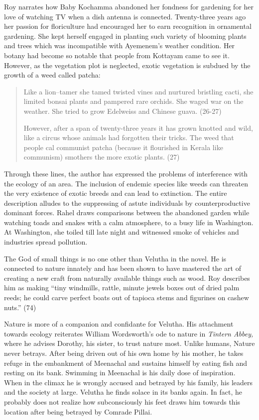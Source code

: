 Roy narrates how Baby Kochamma abandoned her fondness for gardening for her love of watching TV when a dish antenna is connected. Twenty-three years ago her passion for floriculture had encouraged her to earn recognition in ornamental gardening. She kept herself engaged in planting such variety of blooming plants and trees which was incompatible with Ayemenem’s weather condition. Her botany had become so notable that people from Kottayam came to see it. However, as the vegetation plot is neglected, exotic vegetation is subdued by the growth of a weed called patcha:

\begin{quote}
  Like a lion–tamer she tamed twisted vines and nurtured bristling cacti, she limited bonsai plants and pampered rare orchids. She waged war on the weather. She tried to grow Edelweiss and Chinese guava. (26-27)

  However, after a span of twenty-three years it has grown knotted and wild, like a circus whose animals had forgotten their tricks. The weed that people cal communist patcha (because it flourished in Kerala like communism) smothers the more exotic plants. (27)
\end{quote}

Through these lines, the author has expressed the problems of interference with the ecology of an area. The inclusion of endemic species like weeds can threaten the very existence of exotic breeds and can lead to extinction. The entire description alludes to the suppressing of astute individuals by counterproductive dominant forces. Rahel draws comparisons between the abandoned garden while watching toads and snakes with a calm atmosphere, to a busy life in Washington. At Washington, she toiled till late night and witnessed smoke of vehicles and industries spread pollution.

The God of small things is no one other than Velutha in the novel. He is connected to nature innately and has been shown to have mastered the art of creating a new craft from naturally available things such as wood. Roy describes him as making “tiny windmills, rattle, minute jewels boxes out of dried palm reeds; he could carve perfect boats out of tapioca stems and figurines on cashew nuts.” (74)

Nature is more of a companion and confidante for Velutha. His attachment towards ecology reiterates William Wordsworth’s ode to nature in \emph{Tintern Abbey,} where he advises Dorothy, his sister, to trust nature most. Unlike humans, Nature never betrays. After being driven out of his own home by his mother, he takes refuge in the embankment of Meenachal and sustains himself by eating fish and resting on its bank. Swimming in Meenachal is his daily dose of inspiration. When in the climax he is wrongly accused and betrayed by his family, his leaders and the society at large. Velutha he finds solace in its banks again. In fact, he probably does not realize how subconsciously his feet draws him towards this location after being betrayed by Comrade Pillai.

